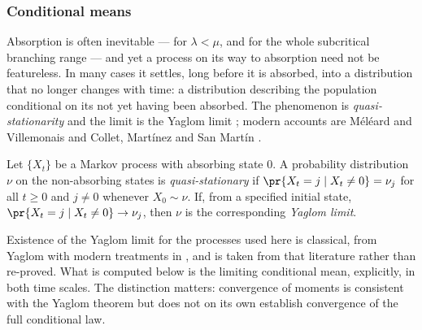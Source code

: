 \subsubsection{Conditional means}
\label{m:sec:condmeans}

Absorption is often inevitable --- for $\lambda<\mu$, and for the whole subcritical
branching range --- and yet a process on its way to absorption need not be
featureless. In many cases it settles, long before it is absorbed, into a
distribution that no longer changes with time: a distribution describing the
population conditional on its not yet having been absorbed. The phenomenon is
\emph{quasi-stationarity} and the limit is the Yaglom limit \cite{Yaglom1947};
modern accounts are Méléard and Villemonais \cite{Meleard2012} and Collet,
Martínez and San Martín \cite{Collet2013}.

\begin{definition}
\label{m:def:qsd}
Let $\{X_t\}$ be a Markov process with absorbing state $0$. A probability
distribution $\nu$ on the non-absorbing states is \emph{quasi-stationary} if
$\pr{X_t=j\mid X_t\neq0}=\nu_j$ for all $t\ge0$ and $j\neq0$ whenever
$X_0\sim\nu$. If, from a specified initial state,
$\pr{X_t=j\mid X_t\neq0}\to\nu_j$, then $\nu$ is the corresponding \emph{Yaglom
limit}.
\end{definition}

Existence of the Yaglom limit for the processes used here is classical, from Yaglom
\cite{Yaglom1947} with modern treatments in \cite{Harris1963,Athreya1972,Meleard2012},
and is taken from that literature rather than re-proved. What is computed below is
the limiting conditional mean, explicitly, in both time scales. The distinction
matters: convergence of moments is consistent with the Yaglom theorem but does not
on its own establish convergence of the full conditional law.

